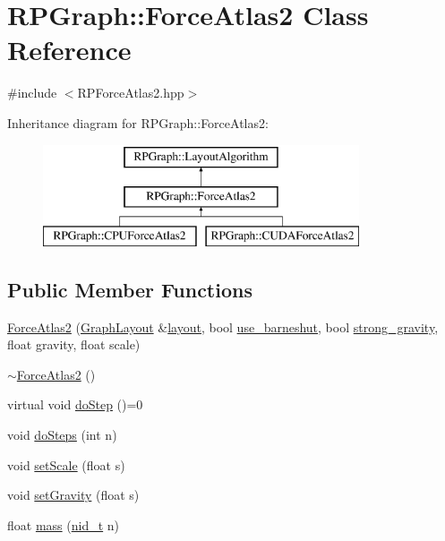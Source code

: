 \hypertarget{classRPGraph_1_1ForceAtlas2}{}\section{R\+P\+Graph\+:\+:Force\+Atlas2 Class Reference}
\label{classRPGraph_1_1ForceAtlas2}


{\ttfamily \#include $<$R\+P\+Force\+Atlas2.\+hpp$>$}

Inheritance diagram for R\+P\+Graph\+:\+:Force\+Atlas2\+:\begin{figure}[H]
\begin{center}
\leavevmode
\includegraphics[height=3.000000cm]{classRPGraph_1_1ForceAtlas2}
\end{center}
\end{figure}
\subsection*{Public Member Functions}
\begin{DoxyCompactItemize}
\item 
\mbox{\hyperlink{classRPGraph_1_1ForceAtlas2_a4c7ce390cdedc886003571f31861eb0c}{Force\+Atlas2}} (\mbox{\hyperlink{classRPGraph_1_1GraphLayout}{Graph\+Layout}} \&\mbox{\hyperlink{classRPGraph_1_1LayoutAlgorithm_ac2335a7ccaeb6cef789ea59b99353cf9}{layout}}, bool \mbox{\hyperlink{classRPGraph_1_1ForceAtlas2_a6ca74377ba79a67e4d1660c61426c090}{use\+\_\+barneshut}}, bool \mbox{\hyperlink{classRPGraph_1_1ForceAtlas2_afabfd0d83e05a54de889a62d0ff7595e}{strong\+\_\+gravity}}, float gravity, float scale)
\item 
\mbox{\hyperlink{classRPGraph_1_1ForceAtlas2_a1be4cef4dacd90f3a6a7c3d216fd0e78}{$\sim$\+Force\+Atlas2}} ()
\item 
virtual void \mbox{\hyperlink{classRPGraph_1_1ForceAtlas2_aa448ceec8292797a6e1b61ef8e2b3744}{do\+Step}} ()=0
\item 
void \mbox{\hyperlink{classRPGraph_1_1ForceAtlas2_ae02d5fff5d824602da4885187361dfb5}{do\+Steps}} (int n)
\item 
void \mbox{\hyperlink{classRPGraph_1_1ForceAtlas2_af052a93a41b8de4d58a19cd142f09c43}{set\+Scale}} (float s)
\item 
void \mbox{\hyperlink{classRPGraph_1_1ForceAtlas2_a2648eec5e0e6c4ba524dec19be09bdfd}{set\+Gravity}} (float s)
\item 
float \mbox{\hyperlink{classRPGraph_1_1ForceAtlas2_ab08806505160d4a5ca2b746dd5a0b1c9}{mass}} (\mbox{\hyperlink{namespaceRPGraph_ab3ae34f1ab88e48f43794c30c8697b74}{nid\+\_\+t}} n)
\end{DoxyCompactItemize}
